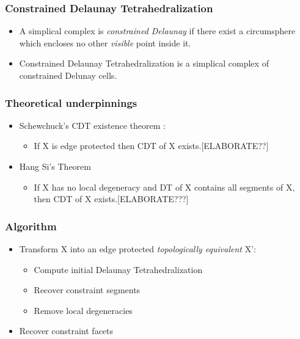 \documentclass{beamer}
\begin{document}
	\begin{frame}
		\frametitle{Constrained Delaunay Tetrahedralization}
			\begin{itemize}
				\item A simplical complex is \textit{constrained Delaunay} if there exist a circumsphere which encloses no other \textit{visible} point inside it.
				\item Constrained Delaunay Tetrahedralization is a simplical complex of constrained Delunay cells.
			\end{itemize}
	\end{frame}	
	\begin{frame}
		\frametitle{Theoretical underpinnings}
			\begin{itemize}
				\item	Schewchuck's CDT existence theorem \cite{schewCDTExistence}:
					\begin{itemize}
						\item If X is edge protected then CDT of X exists.[ELABORATE??]	
					\end{itemize}		
				\item	Hang Si's Theorem \cite{hangSiMeshingPLCByCDT}
					\begin{itemize}
						\item If X has no local degeneracy and DT of X contains all segments of X, then CDT of X exists.[ELABORATE???] 
					\end{itemize}		
			\end{itemize}		
	\end{frame}	
	\begin{frame}
		\frametitle{Algorithm} 
			\begin{itemize}
				\item Transform X into an edge protected \textit{topologically equivalent} X':	
				\begin{itemize}
					\item Compute initial Delaunay Tetrahedralization	
					\item Recover constraint segments
					\item Remove local degeneracies
				\end{itemize}
				\item Recover constraint facets
			\end{itemize}		
	\end{frame}
\end{document}
